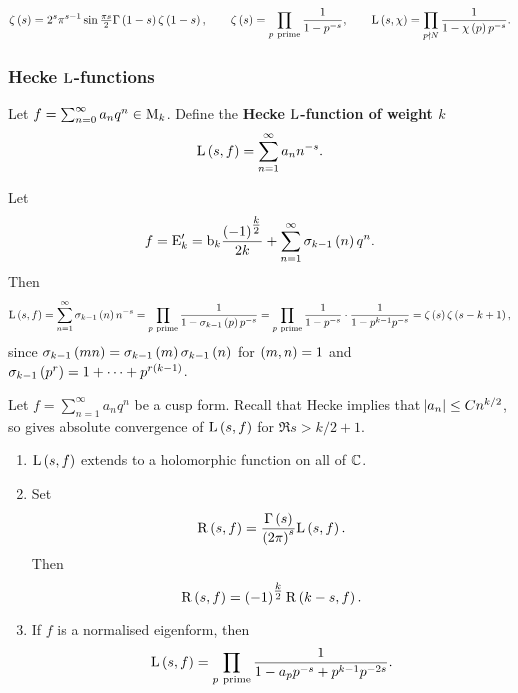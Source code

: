 \pagebreak

\begin{example*}
$$ \zeta\br{s} = 2^s\pi^{s - 1}\sin \tfrac{\pi s}{2}\Gamma\br{1 - s}\zeta\br{1 - s}, \qquad \zeta\br{s} = \prod_{p \ \text{prime}} \dfrac{1}{1 - p^{-s}}, \qquad \L\br{s, \chi} = \prod_{p \nmid N} \dfrac{1}{1 - \chi\br{p}p^{-s}}. $$
\end{example*}

\subsubsection{Hecke \texorpdfstring{$ \mathrm{L} $}{L}-functions}

\begin{definition}
Let $ f = \sum_{n = 0}^\infty a_nq^n \in \mathrm{M}_k $. Define the \textbf{Hecke $ \mathrm{L} $-function of weight $ k $}
$$ \L\br{s, f} = \sum_{n = 1}^\infty a_nn^{-s}. $$
\end{definition}

\begin{example*}
Let
$$ f = \E_k' = \b_k\dfrac{\br{-1}^{\tfrac{k}{2}}}{2k} + \sum_{n = 1}^\infty \sigma_{k - 1}\br{n}q^n. $$
Then
$$ \L\br{s, f} = \sum_{n = 1}^\infty \sigma_{k - 1}\br{n}n^{-s} = \prod_{p \ \text{prime}} \dfrac{1}{1 - \sigma_{k - 1}\br{p}p^{-s}} = \prod_{p \ \text{prime}} \dfrac{1}{1 - p^{-s}} \cdot \dfrac{1}{1 - p^{k - 1}p^{-s}} = \zeta\br{s}\zeta\br{s - k + 1}, $$
since $ \sigma_{k - 1}\br{mn} = \sigma_{k - 1}\br{m}\sigma_{k - 1}\br{n} $ for $ \br{m, n} = 1 $ and $ \sigma_{k - 1}\br{p^r} = 1 + \dots + p^{r\br{k - 1}} $.
\end{example*}


Let $ f = \sum_{n = 1}^\infty a_nq^n $ be a cusp form. Recall that Hecke implies that $ \abs{a_n} \le Cn^{k / 2} $, so gives absolute convergence of $ \L\br{s, f} $ for $ \Re s > k / 2 + 1 $.

\begin{theorem}
\label{thm:lfunction}
\hfill
\begin{enumerate}
\item $ \L\br{s, f} $ extends to a holomorphic function on all of $ \mathbb{C} $.
\item Set
$$ \R\br{s, f} = \dfrac{\Gamma\br{s}}{\br{2\pi}^s}\L\br{s, f}. $$
Then
$$ \R\br{s, f} = \br{-1}^{\tfrac{k}{2}}\R\br{k - s, f}. $$
\item If $ f $ is a normalised eigenform, then
$$ \L\br{s, f} = \prod_{p \ \text{prime}} \dfrac{1}{1 - a_pp^{-s} + p^{k - 1}p^{-2s}}. $$
\end{enumerate}
\end{theorem}

